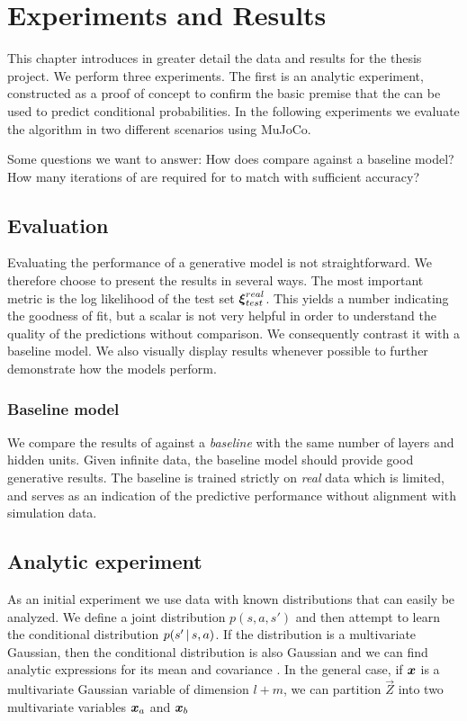 \chapter{Experiments and Results}
\label{experiments}

This chapter introduces in greater detail the data and results for the thesis project. We perform three experiments. The first is an analytic experiment, constructed as a proof of concept to confirm the basic premise that the \cvae{} can be used to predict conditional probabilities. In the following experiments we evaluate the \dettostoc{} algorithm in two different scenarios using MuJoCo.

Some questions we want to answer: How does \dettostoc{} compare against a baseline model? How many iterations of \dettostoc{} are required for \fdecoder{} to match \fsimulator{} with sufficient accuracy?

\section{Evaluation}
Evaluating the performance of a generative model is not straightforward. We therefore choose to present the results in several ways. The most important metric is the log likelihood of the test set $\boldsymbol{\xi}^{real}_{test}$. This yields a number indicating the goodness of fit, but a scalar is not very helpful in order to understand the quality of the predictions without comparison. We consequently contrast it with a baseline model. We also visually display results whenever possible to further demonstrate how the models perform.

\subsection{Baseline model}
We compare the results of \dettostoc{} against a \emph{baseline} \cvae{} with the same number of layers and hidden units. Given infinite data, the baseline model should provide good generative results. The baseline \cvae{} is trained strictly on \emph{real} data which is limited, and serves as an indication of the predictive performance without alignment with simulation data.

\section{Analytic experiment}
\label{exp:analytic}
As an initial experiment we use data with known distributions that can easily be analyzed. We define a joint distribution $p(s,a,s')$ and then attempt to learn the conditional distribution $p\given{s'}{s,a}$. If the distribution is a multivariate Gaussian, then the conditional distribution is also Gaussian and we can find analytic expressions for its mean and covariance \parencite{bishop:2006:PRML}. In the general case, if $\boldsymbol{x}$ is a multivariate Gaussian variable of dimension $l+m$, we can partition $\vec{Z}$ into two multivariate variables $\boldsymbol{x}_a$ and $\boldsymbol{x}_b$


